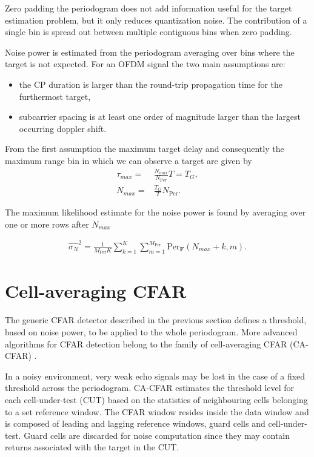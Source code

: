 Zero padding the periodogram does not add information useful for the target estimation problem, but it only reduces quantization noise. The contribution of a single bin is spread out between multiple contiguous bins when zero padding.

Noise power is estimated from the periodogram averaging over bins where the target is not expected. For an OFDM signal the two main assumptions are:

\begin{itemize}
	\item the CP duration is larger than the round-trip propagation time for the furthermost target,
	\item subcarrier spacing is at least one order of magnitude larger than the largest occurring doppler shift.
\end{itemize}

From the first assumption the maximum target delay and consequently the maximum range bin in which we can observe a target are given by
\begin{align}
	\tau_{max} =& \frac{N_{max}}{N_{\text{Per}}}T = T_G ,\\
	N_{max} =& \frac{T_G}{T}N_{\text{Per}}.
\end{align} 

The maximum likelihood estimate for the noise power is found by averaging over one or more rows after $N_{max}$

\begin{align}
\label{align: threshold_noise_power}
	\hat{\sigma_N}^2 = \frac{1}{M_{\text{Per}}K} \sum_{k=1}^K \sum_{m=1}^{M_{\text{Per}}} \text{Per}_{\bm{F}}(N_{max}+k, m).
\end{align}

\section{Cell-averaging CFAR}
\label{sec:cell averaging CFAR}

The generic CFAR detector described in the previous section defines a threshold, based on noise power, to be applied to the whole periodogram. More advanced algorithms for CFAR detection belong to the family of cell-averaging CFAR (CA-CFAR) \cite{Richards_2014}.

In a noisy environment, very weak echo signals may be lost in the case of a fixed threshold across the periodogram. CA-CFAR estimates the threshold level for each cell-under-test (CUT) based on the statistics of neighbouring cells belonging to a set reference window.
The CFAR window resides inside the data window and is composed of leading and lagging reference windows, guard cells and cell-under-test. Guard cells are discarded for noise computation since they may contain returns associated with the target in the CUT.

